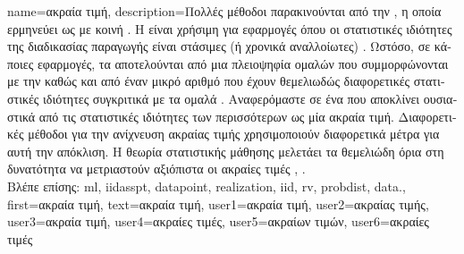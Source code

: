 {name={\foreignlanguage{greek}{ακραία τιμή}}, 
	description={\foreignlanguage{greek}{Πολλές μέθοδοι}   
		\foreignlanguage{greek}{παρακινούνται από την} , \foreignlanguage{greek}{η οποία ερμηνεύει} 
		 \foreignlanguage{greek}{ως}    
		\foreignlanguage{greek}{με κοινή} . \foreignlanguage{greek}{Η}  
		\foreignlanguage{greek}{είναι χρήσιμη για εφαρμογές όπου οι στατιστικές ιδιότητες της διαδικασίας παραγωγής} 
		 \foreignlanguage{greek}{είναι στάσιμες (ή χρονικά αναλλοίωτες)} \cite{Brockwell91}. 
		\foreignlanguage{greek}{Ωστόσο, σε κάποιες εφαρμογές, τα}  \foreignlanguage{greek}{αποτελούνται 
		από μια πλειοψηφία ομαλών}  \foreignlanguage{greek}{που συμμορφώνονται με την} 
		 \foreignlanguage{greek}{καθώς και από έναν μικρό αριθμό}  
		\foreignlanguage{greek}{που έχουν θεμελιωδώς διαφορετικές στατιστικές ιδιότητες συγκριτικά με τα ομαλά}  
        		. \foreignlanguage{greek}{Αναφερόμαστε σε ένα}  \foreignlanguage{greek}{που  
        		αποκλίνει ουσιαστικά από τις στατιστικές ιδιότητες των περισσότερων}  \foreignlanguage{greek}{ως μία
		ακραία τιμή. Διαφορετικές μέθοδοι για την  ανίχνευση ακραίας τιμής χρησιμοποιούν διαφορετικά μέτρα για αυτή την 
		απόκλιση. Η θεωρία στατιστικής μάθησης μελετάει τα θεμελιώδη όρια στη δυνατότητα να μετριαστούν αξιόπιστα 
		οι ακραίες τιμές} \cite{doi:10.1137/0222052}, \cite{10.1214/20-AOS1961}.\\
       		\foreignlanguage{greek}{Βλέπε επίσης:} \gls{ml}, \gls{iidasspt}, \gls{datapoint}, \gls{realization}, \gls{iid}, \gls{rv}, \gls{probdist}, \gls{data}.},
	  first={\foreignlanguage{greek}{ακραία τιμή}}, 
	  text={\foreignlanguage{greek}{ακραία τιμή}},
	  user1={\foreignlanguage{greek}{ακραία τιμή}}, %
  	  user2={\foreignlanguage{greek}{ακραίας τιμής}}, %
	  user3={\foreignlanguage{greek}{ακραία τιμή}}, %
  	  user4={\foreignlanguage{greek}{ακραίες τιμές}}, %
	  user5={\foreignlanguage{greek}{ακραίων τιμών}}, %
  	  user6={\foreignlanguage{greek}{ακραίες τιμές}} %
}

